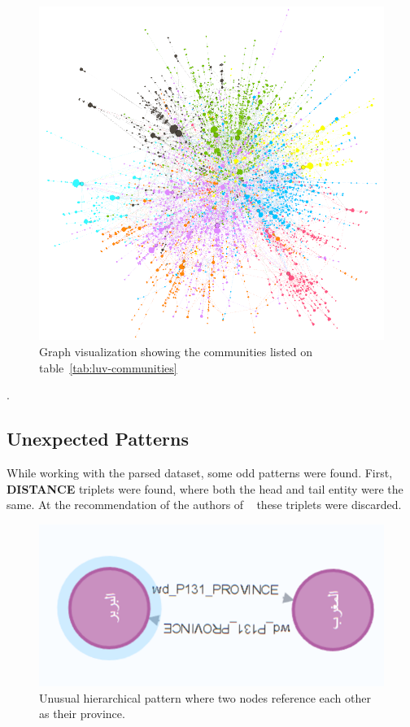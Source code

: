 \begin{figure}[h] %
    \centering %
    \includegraphics[width=0.7\linewidth]{figures/modules} %
    \caption{Graph visualization showing the communities listed on table~\ref{tab:luv-communities}} %
    \label{fig:communities} %
\end{figure}.


\subsection{Unexpected Patterns}\label{subsec:odd-patterns}

While working with the parsed dataset, some odd patterns were found.
First, \textbf{DISTANCE} triplets were found, where both the head and tail entity were the same.
At the recommendation of the authors of ~\cite{YaqutRB} these triplets were discarded.



\begin{figure}[h] %
    \centering %
    \includegraphics[width=0.5\linewidth]{figures/odd1} %
    \caption{Unusual hierarchical pattern where two nodes reference each other as their province.} %
    \label{fig:odd1} %
\end{figure}

